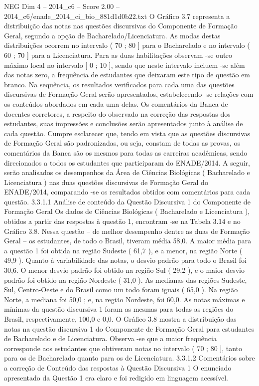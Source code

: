 \begin{textsample}{NEG Dim 4 – 2014\_c6 – Score 2.00 – 2014\_c6/enade\_2014\_ci\_bio\_881d1d0b22.txt}
O Gráfico 3.7 representa a distribuição das notas nas questões discursivas do Componente de Formação Geral, segundo a opção de Bacharelado/Licenciatura.
As modas destas distribuições ocorrem no intervalo ( 70 ; 80 ] para o Bacharelado e no intervalo ( 60 ; 70 ] para a Licenciatura.
Para as duas habilitações observam -se outro máximo local no intervalo [ 0 ; 10 ], sendo que neste intervalo incluem -se além das notas zero, a frequência de estudantes que deixaram este tipo de questão em branco.
Na sequência, os resultados verificados para cada uma das questões discursivas de Formação Geral serão apresentados, estabelecendo -se relações com os conteúdos abordados em cada uma delas.
Os comentários da Banca de docentes corretores, a respeito do observado na correção das respostas dos estudantes, suas impressões e conclusões serão apresentados junto à análise de cada questão.
Cumpre esclarecer que, tendo em vista que as questões discursivas de Formação Geral são padronizadas, ou seja, constam de todas as provas, os comentários da Banca são os mesmos para todas as carreiras acadêmicas, sendo direcionados a todos os estudantes que participaram do ENADE/2014.
A seguir, serão analisados os desempenhos da Área de Ciências Biológicas ( Bacharelado e Licenciatura ) nas duas questões discursivas de Formação Geral do ENADE/2014, comparando -se os resultados obtidos com comentários para cada questão. 3.3.1.1 Análise de conteúdo da Questão Discursiva 1 do Componente de Formação Geral Os dados de Ciências Biológicas ( Bacharelado e Licenciatura ), obtidos a partir das respostas à questão 1, encontram -se na Tabela 3.14 e no Gráfico 3.8.
Nessa questão – de melhor desempenho dentre as duas de Formação Geral – os estudantes, de todo o Brasil, tiveram média 58,0.
A maior média para a questão 1 foi obtida na região Sudeste ( 61,7 ), e a menor, na região Norte ( 49,9 ).
Quanto à variabilidade das notas, o desvio padrão para todo o Brasil foi 30,6.
O menor desvio padrão foi obtido na região Sul ( 29,2 ), e o maior desvio padrão foi obtido na região Nordeste ( 31,0 ).
As medianas das regiões Sudeste, Sul, Centro-Oeste e do Brasil como um todo foram iguais ( 65,0 ).
Na região Norte, a mediana foi 50,0 ; e, na região Nordeste, foi 60,0.
As notas máximas e mínimas da questão discursiva 1 foram as mesmas para todas as regiões do Brasil, respectivamente, 100,0 e 0,0.
O Gráfico 3.8 mostra a distribuição das notas na questão discursiva 1 do Componente de Formação Geral para estudantes de Bacharelado e de Licenciatura.
Observa -se que a maior frequência corresponde aos estudantes que obtiveram notas no intervalo ( 70 ; 80 ], tanto para os de Bacharelado quanto para os de Licenciatura. 3.3.1.2 Comentários sobre a correção de Conteúdo das respostas à Questão Discursiva 1 O enunciado apresentado da Questão 1 era claro e foi redigido em linguagem acessível.

\end{textsample}
